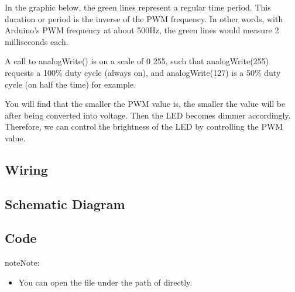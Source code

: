 \documentclass[a4paper,11pt,english]{sphinxmanual}
\begin{document}
\sphinxAtStartPar
In the graphic below, the green lines represent a regular time period. This duration or period is the inverse of the PWM frequency. In other words, with Arduino’s PWM frequency at about 500Hz, the green lines would measure 2 milliseconds each.


\sphinxAtStartPar
A call to analogWrite() is on a scale of 0 \sphinxhyphen{} 255, such that analogWrite(255) requests a 100\% duty cycle (always on), and analogWrite(127) is a 50\% duty cycle (on half the time) for example.

\sphinxAtStartPar
You will find that the smaller the PWM value is, the smaller the value will be after being converted into voltage. Then the LED becomes dimmer accordingly. Therefore, we can control the brightness of the LED by controlling the PWM value.


\subsection{Wiring}
\label{\detokenize{Basic_Project/RGB_LED:wiring}}


\subsection{Schematic Diagram}
\label{\detokenize{Basic_Project/RGB_LED:schematic-diagram}}


\subsection{Code}
\label{\detokenize{Basic_Project/RGB_LED:code}}
\begin{sphinxadmonition}{note}{Note:}\begin{itemize}
\item {} 
\sphinxAtStartPar
You can open the file  under the path of  directly.

\end{itemize}
\end{sphinxadmonition}
\end{document}

